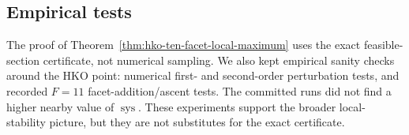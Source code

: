 \subsection{Empirical tests}
\label{subsec:hko-local-maximum-empirical-tests}

The proof of Theorem~\ref{thm:hko-ten-facet-local-maximum} uses the exact
feasible-section certificate, not numerical sampling. We also kept empirical
sanity checks around the HKO point: numerical first- and second-order
perturbation tests, and recorded \(F=11\) facet-addition/ascent tests. The
committed runs did not find a higher nearby value of \(\operatorname{sys}\).
These experiments support the broader local-stability picture, but they are not
substitutes for the exact certificate.
